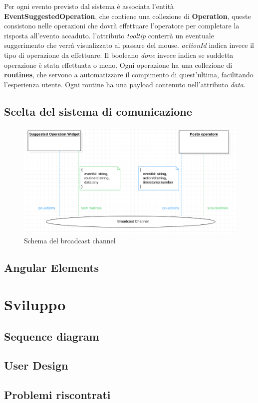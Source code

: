 Per ogni evento previsto dal sistema è associata l'entità \textbf{EventSuggestedOperation}, che contiene una collezione
di \textbf{Operation}, queste consistono nelle operazioni che dovrà effettuare l'operatore per completare la risposta 
all'evento accaduto. l'attributo \emph{tooltip} conterrà un eventuale suggerimento che verrà visualizzato al passare del 
mouse. \emph{actionId} indica invece il tipo di operazione da effettuare. Il booleano \emph{done} invece indica se suddetta 
operazione è stata effettuata o meno. Ogni operazione ha una collezione di \textbf{routines}, che servono a automatizzare il compimento 
di quest'ultima, facilitando l'esperienza utente. Ogni routine ha una payload contenuto nell'attributo \emph{data}.


\subsection{Scelta del sistema di comunicazione}

\begin{figure}[H]
    \centering
    \includegraphics[width=150mm]{img/broadcast_channel}
    \caption{Schema del broadcast channel}
  \end{figure}

  

\subsection{Angular Elements}


\section{Sviluppo}

\subsection{Sequence diagram}


\subsection{User Design}

\subsection{Problemi riscontrati}

